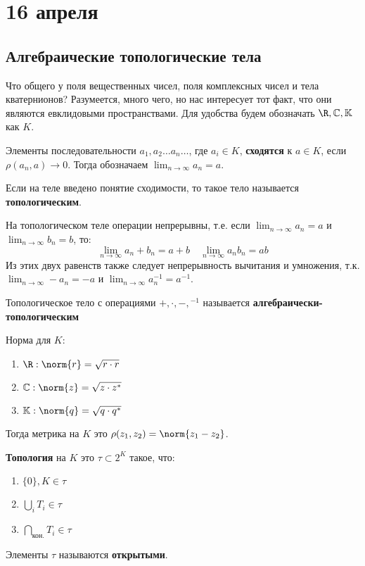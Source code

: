 \chapter{16 апреля}

\section{Алгебраические топологические тела}

Что общего у поля вещественных чисел, поля комплексных чисел и тела кватернионов?
Разумеется, много чего, но нас интересует тот факт, что они являются евклидовыми пространствами.
Для удобства будем обозначать \(\R, \mathbb{C}, \mathbb{K}\) как \(K\).

\begin{definition}
	Элементы последовательности \(a_1, a_2 \ldots a_n \ldots\), где \(a_i \in K\),
	\textbf{сходятся} к \(a \in K\), если \(\rho(a_n, a) \to 0\).
	Тогда обозначаем \(\lim_{n\to \infty} a_n = a\).
\end{definition}

\begin{definition}
	Если на теле введено понятие сходимости, то такое тело называется \textbf{топологическим}.
\end{definition}

На топологическом теле операции непрерывны, т.е. если \(\lim_{n\to \infty} a_n = a\) и \(\lim_{n \to \infty} b_n = b\), то:
\[\lim_{n \to \infty} a_n + b_n = a + b \quad \lim_{n \to \infty} a_n b_n = a b\]
Из этих двух равенств также следует непрерывность вычитания и умножения,
т.к. \(\lim_{n \to \infty} -a_n = -a\) и \(\lim_{n \to \infty} a_n^{-1} = a^{-1}\).

\begin{definition}
	Топологическое тело с операциями \(+, \cdot, -, {}^{-1}\) называется \textbf{алгебраически-топологическим}
\end{definition}

Норма для \(K\):
\begin{enumerate}
	\item \(\R: \norm{r} = \sqrt{r \cdot r}\)
	\item \(\mathbb{C}: \norm{z} = \sqrt{z\cdot z^*}\)
	\item \(\mathbb{K}: \norm{q} = \sqrt{q \cdot q^*}\)
\end{enumerate}

Тогда метрика на \(K\) это \(\rho(z_1, z_2) = \norm{z_1 - z_2}\).

\begin{definition}
	\textbf{Топология} на \(K\) это \(\tau \subset 2^K\) такое, что:
	\begin{enumerate}
		\item \(\{0\}, K \in \tau\)
		\item \(\bigcup_i T_i \in \tau\)
		\item \(\bigcap_{\text{кон.}} T_i \in \tau\)
	\end{enumerate}
	Элементы \(\tau\) называются \textbf{открытыми}.
\end{definition}

